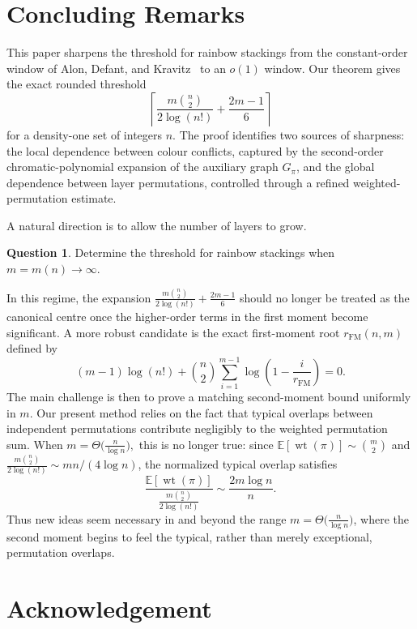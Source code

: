 \documentclass[11pt,reqno]{amsart}
\theoremstyle{definition}
\newtheorem{question}[theorem]{Question}
\theoremstyle{remark}
\renewcommand\to{\rightarrow}
\newcommand{\wt}{\operatorname{wt}}
\begin{document}
\section{Concluding Remarks}\label{sec:conclusion}

This paper sharpens the threshold for rainbow stackings from the constant-order window of Alon, Defant, and Kravitz~\cite{ADK} to an $o(1)$ window.
Our theorem gives the exact rounded threshold
\[
\left\lceil \frac{m\binom{n}{2}}{2\log(n!)}+\frac{2m-1}{6}\right\rceil
\]
for a density-one set of integers $n$.  The proof identifies two sources of sharpness: the local dependence between colour conflicts, captured by the second-order chromatic-polynomial expansion of the auxiliary graph $G_\pi$, and the global dependence between layer permutations, controlled through a refined weighted-permutation estimate.

A natural direction is to allow the number of layers to grow.

\begin{question}
Determine the threshold for rainbow stackings when $m=m(n)\to\infty$.
\end{question}

In this regime, the expansion
$        \frac{m\binom{n}{2}}{2\log(n!)}+\frac{2m-1}{6}$
should no longer be treated as the canonical centre once the higher-order terms in the first moment become significant.  A more robust candidate is the exact first-moment root $r_{\mathrm{FM}}(n,m)$ defined by
\[
        (m-1)\log(n!)
        +\binom{n}{2}\sum_{i=1}^{m-1}\log\left(1-\frac{i}{r_{\mathrm{FM}}}\right)=0.
\]
The main challenge is then to prove a matching second-moment bound uniformly in $m$.  Our present method relies on the fact that typical overlaps between independent permutations contribute negligibly to the weighted permutation sum.  When $m=\Theta \big(\frac{n}{\log n}\big),$
this is no longer true: since $\mathbb E[\wt(\pi)]\sim \binom{m}{2}$ and $\frac{m\binom{n}{2}}{2\log(n!)}\sim mn/(4\log n)$, the normalized typical overlap satisfies
\[
\frac{\mathbb E[\wt(\pi)]}{\frac{m\binom{n}{2}}{2\log(n!)}}\sim \frac{2m\log n}{n}.
\]
Thus new ideas seem necessary in and beyond the range $m=\Theta \big(\frac{n}{\log n}\big)$, where the second moment begins to feel the typical, rather than merely exceptional, permutation overlaps.


\medskip


\section*{Acknowledgement}
\end{document}
